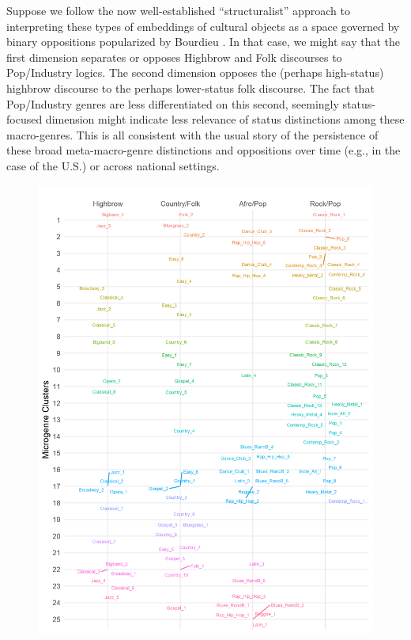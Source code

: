 \documentclass[a4paper,12pt]{extarticle}
\begin{document}
 Suppose we follow the now well-established ``structuralist'' approach to interpreting these types of embeddings of cultural objects as a space governed by binary oppositions popularized by Bourdieu \citeyearpar{bourdieu84}. In that case, we might say that the first dimension separates or opposes Highbrow and Folk discourses to Pop/Industry logics. The second dimension opposes the (perhaps high-status) highbrow discourse to the perhaps lower-status folk discourse. The fact that Pop/Industry genres are less differentiated on this second, seemingly status-focused dimension might indicate less relevance of status distinctions among these macro-genres. This is all consistent with the usual story of the persistence of these broad meta-macro-genre distinctions and oppositions over time (e.g., in the case of the U.S.) or across national settings. 

\begin{figure}[ht!]
    \includegraphics[width=1.0\textwidth]{Figs/Link Clust/macro-v-micro-clust.png}
    \caption{}
    \label{fig:macro-v-micro-cluster}
 \end{figure}
 
\end{document}
